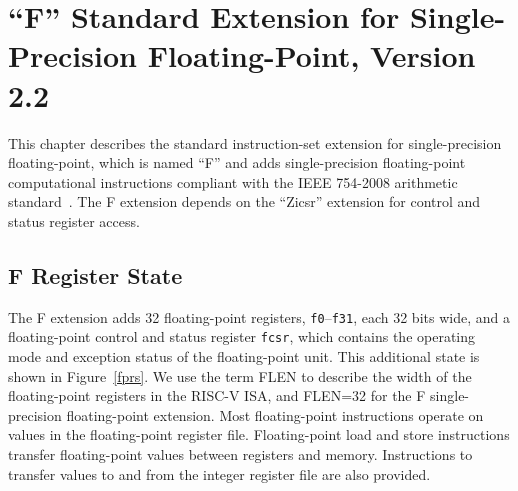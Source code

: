 \chapter{``F'' Standard Extension for Single-Precision Floating-Point,
Version 2.2}
\label{sec:single-float}

This chapter describes the standard instruction-set extension for
single-precision floating-point, which is named ``F'' and adds
single-precision floating-point computational instructions compliant
with the IEEE 754-2008 arithmetic standard~\cite{ieee754-2008}.
The F extension depends on the ``Zicsr'' extension for control
and status register access.

\section{F Register State}

The F extension adds 32 floating-point registers, {\tt f0}--{\tt f31},
each 32 bits wide, and a floating-point control and status register
{\tt fcsr}, which contains the operating mode and exception status of the
floating-point unit.  This additional state is shown in
Figure~\ref{fprs}.  We use the term FLEN to describe the width of the
floating-point registers in the RISC-V ISA, and FLEN=32 for the F
single-precision floating-point extension.  Most floating-point
instructions operate on values in the floating-point register file.
Floating-point load and store instructions transfer floating-point
values between registers and memory.  Instructions to transfer values
to and from the integer register file are also provided.

